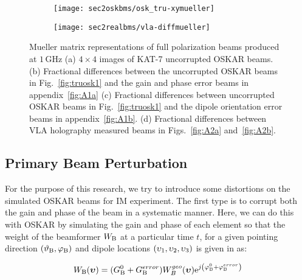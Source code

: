   \begin{figure}
\ContinuedFloat
\centering
 \begin{minipage}[H]{\linewidth}
\begin{subfigure}[b]{0.8\textwidth}
      \texttt{[image: sec2oskbms/osk\_tru-xymueller]}
                \caption{}
                \label{fig:truosk3}
        \end{subfigure}
        \qquad
        \begin{subfigure}[b]{0.8\textwidth}
         \texttt{[image: sec2realbms/vla-diffmueller]}
                \caption{}
               \label{fig:truosk4}
        \end{subfigure}
         \end{minipage}
    \caption{\small{ Mueller matrix representations of full polarization beams produced at $1\, \mathrm{GHz}$
    (a) $4 \times 4$ images of KAT-7 uncorrupted OSKAR beams.
    (b) Fractional differences between the uncorrupted OSKAR beams in Fig.~\ref{fig:truosk1} and the gain and phase error beams in appendix~\ref{fig:A1a} 
     (c) Fractional differences between uncorrupted OSKAR beams in Fig.~\ref{fig:truosk1} and the dipole orientation error beams in  appendix~\ref{fig:A1b}.
     (d) Fractional differences between VLA holography measured beams in   Figs.~\ref{fig:A2a} and~\ref{fig:A2b}.}}      
	    \label{fig:truosk}
  \end{figure}
  \FloatBarrier

\subsection{Primary Beam Perturbation}       \label{sec:perturb}

For the purpose of this research, we try to introduce some distortions on the simulated OSKAR beams for IM experiment.
The first type is to corrupt both the gain and phase of the beam in a systematic manner. Here, we can do this with OSKAR by simulating
the gain and phase of each element so that the weight of the beamformer $W_{\rm B}$ at a particular time $t$, for a given pointing direction $(\vartheta_{\rm B}, \varphi_{\rm B})$
and dipole locations $(\upsilon_{\rm 1}, \upsilon_{\rm 2}, \upsilon_{\rm 3})$ is given in \citep{ansah2018simulations} as:

\begin{equation} W_{\rm B} (\boldsymbol{\upsilon}) =  (G_{\rm B}^{ 0} + G_{\rm B}^{error}) W_{B}^{geo}(\boldsymbol{\upsilon})\mathrm{e}^{j\left(\varphi_{\rm B}^{0} + \varphi_{\rm B}^{error} \right)} \label{eq:q11} \end{equation} 


